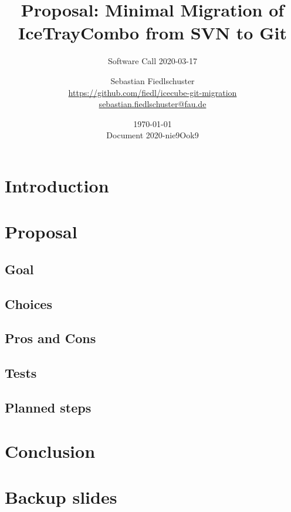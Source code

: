 \documentclass[green, 12pt]{beamer}
\title[Proposal: Minimal Migration of IceTrayCombo from SVN to Git, \url{https://github.com/fiedl/icecube-git-migration/issues/9}]{Proposal: Minimal Migration of IceTrayCombo from SVN to Git}
\subtitle{Software Call 2020-03-17}
\date{\today \\ \vspace*{2mm} \tiny{Document 2020-nie9Ook9} \normalsize}
\author[Sebastian Fiedlschuster]{Sebastian Fiedlschuster \\ \small\url{https://github.com/fiedl/icecube-git-migration} \\
\small\url{sebastian.fiedlschuster@fau.de}}
\institute{Erlangen Centre for Astroparticle Physics}
\newif\ifplacelogo %
\begin{document}



\placelogofalse

\newcommand\done{\checkmark\xspace}
\newcommand\inprogress{$\Rightarrow$\xspace}
\newcommand\tobedone{$\square$\xspace}

\newcommand\question[1]{\colorbox{blue!10}{\fbox{\ \ \questionicon \ \ #1}}}

\section{Introduction}



\section{Proposal}
\subsection{Goal}
\subsection{Choices}
\subsection{Pros and Cons}

\subsection{Tests}

\subsection{Planned steps}




\section{Conclusion}



\appendix
\section{Backup slides}




\end{document}
